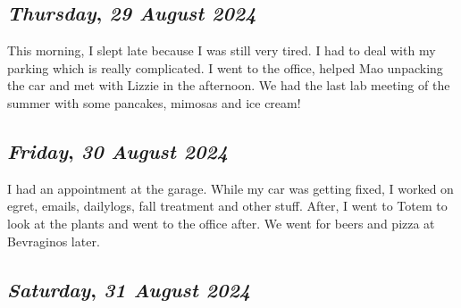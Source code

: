 \def\day{\textit{29 August 2024}}
\def\weekday{\textit{Thursday}}
\subsection*{\weekday, \day}
This morning, I slept late because I was still very tired. I had to deal with my parking which is really complicated. I went to the office, helped Mao unpacking the car and met with Lizzie in the afternoon. We had the last lab meeting of the summer with some pancakes, mimosas and ice cream!

\def\day{\textit{30 August 2024}}
\def\weekday{\textit{Friday}}
\subsection*{\weekday, \day}
I had an appointment at the garage. While my car was getting fixed, I worked on egret, emails, dailylogs, fall treatment and other stuff. After, I went to Totem to look at the plants and went to the office after. We went for beers and pizza at Bevraginos later.
\def\day{\textit{31 August 2024}}
\def\weekday{\textit{Saturday}}
\subsection*{\weekday, \day}
